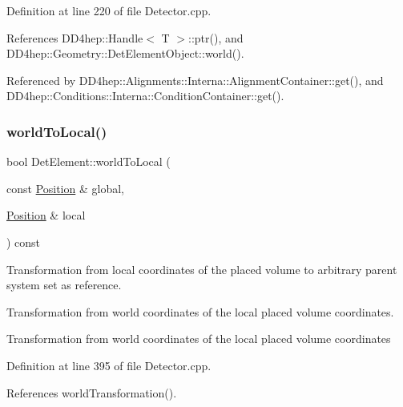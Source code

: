 Definition at line 220 of file Detector.\+cpp.



References D\+D4hep\+::\+Handle$<$ T $>$\+::ptr(), and D\+D4hep\+::\+Geometry\+::\+Det\+Element\+Object\+::world().



Referenced by D\+D4hep\+::\+Alignments\+::\+Interna\+::\+Alignment\+Container\+::get(), and D\+D4hep\+::\+Conditions\+::\+Interna\+::\+Condition\+Container\+::get().

\hypertarget{class_d_d4hep_1_1_geometry_1_1_det_element_acbfaa3838fb9d3b6120ea8fe289cdb15}{}\label{class_d_d4hep_1_1_geometry_1_1_det_element_acbfaa3838fb9d3b6120ea8fe289cdb15} 
\subsubsection{\texorpdfstring{world\+To\+Local()}{worldToLocal()}}
{\footnotesize\ttfamily bool Det\+Element\+::world\+To\+Local (\begin{DoxyParamCaption}\item[{const \hyperlink{namespace_d_d4hep_1_1_geometry_a55083902099d03506c6db01b80404900}{Position} \&}]{global,  }\item[{\hyperlink{namespace_d_d4hep_1_1_geometry_a55083902099d03506c6db01b80404900}{Position} \&}]{local }\end{DoxyParamCaption}) const}



Transformation from local coordinates of the placed volume to arbitrary parent system set as reference. 

Transformation from world coordinates of the local placed volume coordinates.

Transformation from world coordinates of the local placed volume coordinates 

Definition at line 395 of file Detector.\+cpp.



References world\+Transformation().

\hypertarget{class_d_d4hep_1_1_geometry_1_1_det_element_acaf0a39faf4eeab43c30158c9a7169ec}{}\label{class_d_d4hep_1_1_geometry_1_1_det_element_acaf0a39faf4eeab43c30158c9a7169ec} 
